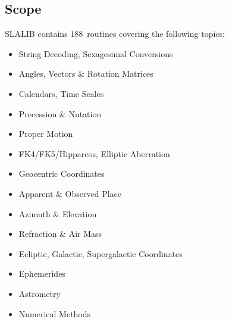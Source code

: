 \documentclass[11pt,twoside,nolof]{starlink}
\providecommand{\nroutines} {188}
\begin{document}
\subsection{Scope}
SLALIB contains \nroutines\ routines covering the following topics:
\begin{itemize}
\item String Decoding,
      Sexagesimal Conversions
\item Angles, Vectors \& Rotation Matrices
\item Calendars,
      Time Scales
\item Precession \& Nutation
\item Proper Motion
\item FK4/FK5/Hipparcos,
      Elliptic Aberration
\item Geocentric Coordinates
\item Apparent \& Observed Place
\item Azimuth \& Elevation
\item Refraction \& Air Mass
\item Ecliptic,
      Galactic,
      Supergalactic Coordinates
\item Ephemerides
\item Astrometry
\item Numerical Methods
\end{itemize}
\end{document}
